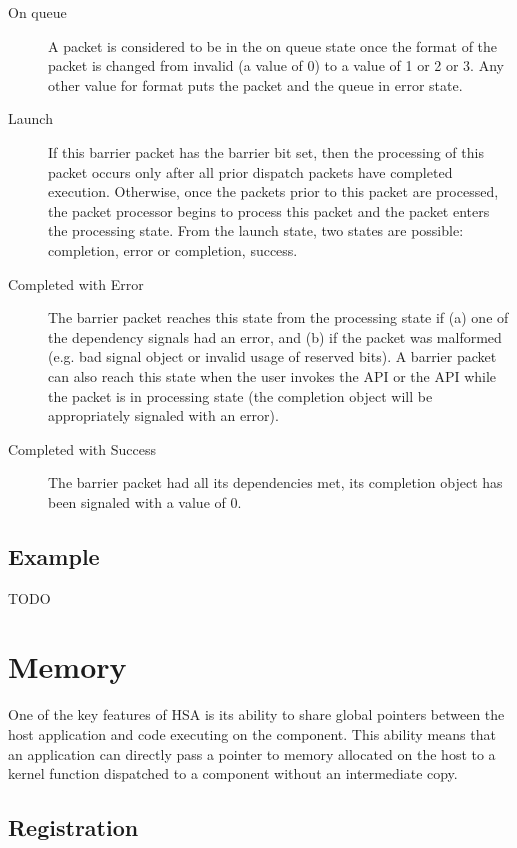 \documentclass[draft]{book}
\begin{document}
\begin{description}
\item[On queue] A packet is considered to be in the on queue state once
  the format of the packet is changed from invalid (a value of 0) to a value of
  1 or 2 or 3. Any other value for format puts the packet and the queue in error
  state.
\item[Launch] If this barrier packet has the barrier bit set, then the
  processing of this packet occurs only after all prior dispatch packets have
  completed execution. Otherwise, once the packets prior to this packet are
  processed, the packet processor begins to process this packet and the packet
  enters the processing state. From the launch state, two states are possible:
  completion, error or completion, success.
\item[Completed with Error] The barrier packet reaches this state from the
  processing state if (a) one of the dependency signals had an error, and (b) if
  the packet was malformed (e.g. bad signal object or invalid usage of reserved
  bits). A barrier packet can also reach this state when the user invokes the
   API or the  API while
  the packet is in processing state (the completion object will be appropriately
  signaled with an error).
\item[Completed with Success] The barrier packet had all its dependencies met,
  its completion object has been signaled with a value of 0.
\end{description}

\hypertarget{aql-example}{}\subsection{Example}\label{aql-example}
TODO

\section{Memory}\label{memory}\hypertarget{memory}{}

One of the key features of HSA is its ability to share global pointers between
the host application and code executing on the component. This ability means
that an application can directly pass a pointer to memory allocated on the host
to a kernel function dispatched to a component without an intermediate copy.

\hypertarget{memory-registration}{}\subsection{Registration}\label{memory-registration}
\end{document}
